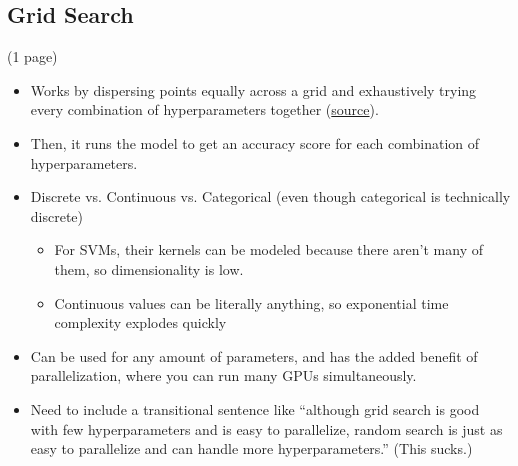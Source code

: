 \documentclass[stu,12pt,floatsintext]{apa7}
\begin{document}
\subsection{Grid Search}
(1 page)
\begin{itemize}
    \item Works by dispersing points equally across a grid and exhaustively trying every combination of hyperparameters together (\href{https://www.w3schools.com/python/python_ml_grid_search.asp}{source}). 
    \item Then, it runs the model to get an accuracy score for each combination of hyperparameters. 
    \item Discrete vs. Continuous vs. Categorical (even though categorical is technically discrete)
    \begin{itemize}
        \item For SVMs, their kernels can be modeled because there aren't many of them, so dimensionality is low. 
        \item Continuous values can be literally anything, so exponential time complexity explodes quickly
    \end{itemize}
    \item Can be used for any amount of parameters, and has the added benefit of parallelization, where you can run many GPUs simultaneously. 
    \item Need to include a transitional sentence like ``although grid search is good with few hyperparameters and is easy to parallelize, random search is just as easy to parallelize and can handle more hyperparameters.'' (This sucks.)
\end{itemize}
\end{document}
